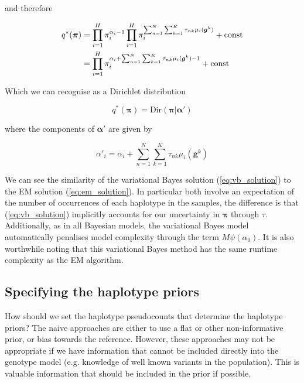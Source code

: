\documentclass{article}
\begin{document}
and therefore

\begin{align}
    q^*(\boldsymbol{\pi}) &= \prod_{i = 1}^H \pi_i^{\alpha_i - 1} \prod_{i = 1}^H \pi_i^{\sum_{n = 1}^N \sum_{k = 1}^K \tau_{nk} \mu_i(\boldsymbol{g}^k)} + \text{const} \notag \\
    &= \prod_{i = 1}^H \pi_i^{\alpha_i + \sum_{n = 1}^N \sum_{k = 1}^K \tau_{nk} \mu_i(\boldsymbol{g}^k) - 1} + \text{const}
\end{align}

Which we can recognise as a Dirichlet distribution

\begin{equation}
q^*(\boldsymbol{\pi}) = \text{Dir}(\boldsymbol{\pi} | \boldsymbol{\alpha}')
\end{equation}

where the components of $\boldsymbol{\alpha}'$ are given by

\begin{equation}
\label{eq:vb_solution}
\alpha'_i = \alpha_i + \sum_{n = 1}^N \sum_{k = 1}^K \tau_{nk} \mu_i(\boldsymbol{g}^k)
\end{equation}

We can see the similarity of the variational Bayes solution (\ref{eq:vb_solution}) to the EM solution (\ref{eq:em_solution}). In particular both involve an expectation of the number of occurrences of each haplotype in the samples, the difference is that (\ref{eq:vb_solution}) implicitly accounts for our uncertainty in $\boldsymbol{\pi}$ through $\tau$. Additionally, as in all Bayesian models, the variational Bayes model automatically penalises model complexity through the term $M\psi(\alpha_0)$. It is also worthwhile noting that this variational Bayes method has the same runtime complexity as the EM algorithm.

\subsection{Specifying the haplotype priors}

How should we set the haplotype pseudocounts that determine the haplotype priors? The naive approaches are either to use a flat or other non-informative prior, or bias towards the reference. However, these approaches may not be appropriate if we have information that cannot be included directly into the genotype model (e.g. knowledge of well known variants in the population). This is valuable information that should be included in the prior if possible.
\end{document}
